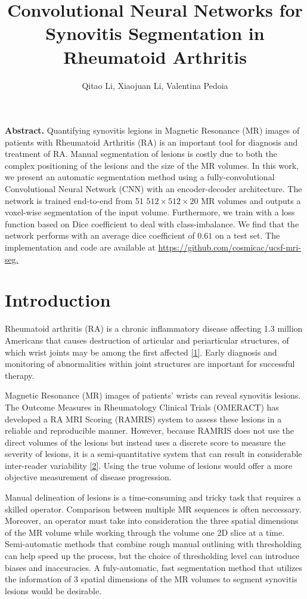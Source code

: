 \documentclass[11pt]{article}
\title{\textbf{Convolutional Neural Networks for Synovitis Segmentation in Rheumatoid Arthritis}}
\date{}
\author{Qitao Li, Xiaojuan Li, Valentina Pedoia}
\begin{document}
\maketitle

\noindent \textbf{Abstract.} Quantifying synovitis legions in Magnetic Resonance (MR) images of patients with Rheumatoid Arthritis (RA) is an important tool for diagnosis and treatment of RA. Manual segmentation of lesions is costly due to both the complex positioning of the lesions and the size of the MR volumes. In this work, we present an automatic segmentation method using a fully-convolutional Convolutional Neural Network (CNN) with an encoder-decoder architecture. The network is trained end-to-end from 51 $512 \times 512 \times 20$ MR volumes and outputs a voxel-wise segmentation of the input volume. Furthermore, we train with a loss function based on Dice coefficient to deal with class-imbalance. We find that the network performs with an average dice coefficient of $0.61$ on a test set. The implementation and code are available at \url{https://github.com/cosmicac/ucsf-mri-seg.} 

\section{Introduction}

Rheumatoid arthritis (RA) is a chronic inflammatory disease affecting 1.3 million Americans that causes destruction of articular and periarticular structures, of which wrist joints may be among the first affected \hyperref[gab]{[1]}. Early diagnosis and monitoring of abnormalities within joint structures are important for successful therapy.

Magnetic Resonance (MR) images of patients' wrists can reveal synovitis lesions. The Outcome Measures in Rheumatology Clinical Trials (OMERACT) has developed a RA MRI Scoring (RAMRIS) system to assess these lesions in a reliable and reproducible manner. However, because RAMRIS does not use the direct volumes of the lesions but instead uses a discrete score to measure the severity of lesions, it is a semi-quantitative system that can result in considerable inter-reader variability \hyperref[hodge]{[2]}. Using the true volume of lesions would offer a more objective measurement of disease progression. 

Manual delineation of lesions is a time-consuming and tricky task that requires a skilled operator. Comparison between multiple MR sequences is often neccessary. Moreover, an operator must take into consideration the three spatial dimensions of the MR volume while working through the volume one 2D slice at a time. Semi-automatic methods that combine rough manual outlining with thresholding can help speed up the process, but the choice of thresholding level can introduce biases and inaccuracies. A fuly-automatic, fast segmentation method that utilizes the information of 3 spatial dimensions of the MR volumes to segment synovitis lesions would be desirable.
\end{document}
